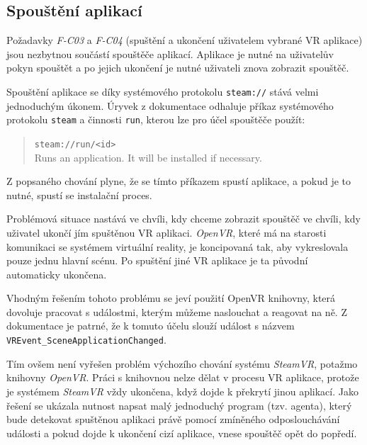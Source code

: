 \subsection{Spouštění
aplikací}\label{spouux161tux11bnuxed-aplikacuxed}

Požadavky \emph{F-C03} a \emph{F-C04} (spuštění a ukončení uživatelem
vybrané VR aplikace) jsou nezbytnou součástí spouštěče
aplikací. Aplikace je nutné na uživatelův pokyn spouštět a po jejich ukončení 
je nutné uživateli znova zobrazit spouštěč.

Spouštění aplikace se díky systémového protokolu \texttt{steam://} stává
velmi jednoduchým úkonem. Úryvek z dokumentace \autocite{protocoldocs} odhaluje příkaz
systémového protokolu \texttt{steam} a činnosti \texttt{run}, kterou lze
pro účel spouštěče použít:

\begin{quote}
\texttt{steam://run/\textless{}id\textgreater{}}\\
Runs an application. It will be installed if necessary.
\end{quote}

Z popsaného chování plyne, že se tímto příkazem spustí aplikace, a pokud je
to nutné, spustí se instalační proces. 

Problémová situace nastává ve
chvíli, kdy chceme zobrazit spouštěč ve chvíli, kdy uživatel
ukončí jím spuštěnou VR aplikaci. \emph{OpenVR}, které má na starosti
komunikaci se systémem virtuální reality, je koncipovaná tak, 
aby vykreslovala pouze jednu hlavní scénu. Po spuštění jiné VR aplikace 
je ta původní automaticky ukončena. \autocite{steamvrshuts}

Vhodným řešením tohoto problému se jeví použití OpenVR knihovny, která
dovoluje pracovat s událostmi, kterým můžeme naslouchat a reagovat na
ně. Z dokumentace \autocite{openvrdocs} je patrné, že k tomuto účelu slouží událost s názvem
\texttt{VREvent\_SceneApplicationChanged}. 

Tím ovšem není vyřešen
problém výchozího chování systému \emph{SteamVR}, potažmo knihovny
\emph{OpenVR}. Práci s knihovnou nelze dělat v procesu VR aplikace,
protože je systémem \emph{SteamVR} vždy ukončena, když dojde k 
překrytí jinou aplikací. Jako řešení se ukázala nutnost napsat malý 
jednoduchý program (tzv. agenta), který bude detekovat spuštěnou aplikaci právě
pomocí zmíněného odposlouchávání události a pokud dojde k ukončení cizí 
aplikace, vnese spouštěč opět do popředí.

